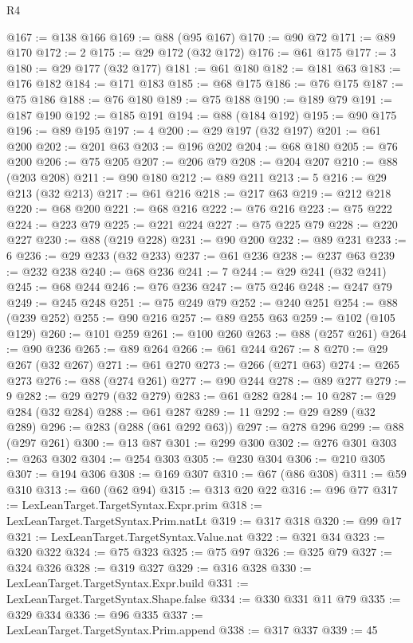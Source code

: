 \begin{lexlean}{R4}
\begin{coremodule}
{{{{{{{{{{{{{{{{{{{{{{{{{{{{{{{{{{{{{{{{{{{{{{{{{{{{{{{{{{{{{{{{{{{{{{{{{{{{{{{{{{{{{{{{{{{{@167 := @138 @166
@169 := @88 (@95 @167)
@170 := @90 @72
@171 := @89 @170
@172 := 2
@175 := @29 @172 (@32 @172)
@176 := @61 @175
@177 := 3
@180 := @29 @177 (@32 @177)
@181 := @61 @180
@182 := @181 @63
@183 := @176 @182
@184 := @171 @183
@185 := @68 @175
@186 := @76 @175
@187 := @75 @186
@188 := @76 @180
@189 := @75 @188
@190 := @189 @79
@191 := @187 @190
@192 := @185 @191
@194 := @88 (@184 @192)
@195 := @90 @175
@196 := @89 @195
@197 := 4
@200 := @29 @197 (@32 @197)
@201 := @61 @200
@202 := @201 @63
@203 := @196 @202
@204 := @68 @180
@205 := @76 @200
@206 := @75 @205
@207 := @206 @79
@208 := @204 @207
@210 := @88 (@203 @208)
@211 := @90 @180
@212 := @89 @211
@213 := 5
@216 := @29 @213 (@32 @213)
@217 := @61 @216
@218 := @217 @63
@219 := @212 @218
@220 := @68 @200
@221 := @68 @216
@222 := @76 @216
@223 := @75 @222
@224 := @223 @79
@225 := @221 @224
@227 := @75 @225 @79
@228 := @220 @227
@230 := @88 (@219 @228)
@231 := @90 @200
@232 := @89 @231
@233 := 6
@236 := @29 @233 (@32 @233)
@237 := @61 @236
@238 := @237 @63
@239 := @232 @238
@240 := @68 @236
@241 := 7
@244 := @29 @241 (@32 @241)
@245 := @68 @244
@246 := @76 @236
@247 := @75 @246
@248 := @247 @79
@249 := @245 @248
@251 := @75 @249 @79
@252 := @240 @251
@254 := @88 (@239 @252)
@255 := @90 @216
@257 := @89 @255 @63
@259 := @102 (@105 @129)
@260 := @101 @259
@261 := @100 @260
@263 := @88 (@257 @261)
@264 := @90 @236
@265 := @89 @264
@266 := @61 @244
@267 := 8
@270 := @29 @267 (@32 @267)
@271 := @61 @270
@273 := @266 (@271 @63)
@274 := @265 @273
@276 := @88 (@274 @261)
@277 := @90 @244
@278 := @89 @277
@279 := 9
@282 := @29 @279 (@32 @279)
@283 := @61 @282
@284 := 10
@287 := @29 @284 (@32 @284)
@288 := @61 @287
@289 := 11
@292 := @29 @289 (@32 @289)
@296 := @283 (@288 (@61 @292 @63))
@297 := @278 @296
@299 := @88 (@297 @261)
@300 := @13 @87
@301 := @299 @300
@302 := @276 @301
@303 := @263 @302
@304 := @254 @303
@305 := @230 @304
@306 := @210 @305
@307 := @194 @306
@308 := @169 @307
@310 := @67 (@86 @308)
@311 := @59 @310
@313 := @60 (@62 @94)
@315 := @313 @20 @22
@316 := @96 @77
@317 := LexLeanTarget.TargetSyntax.Expr.prim
@318 := LexLeanTarget.TargetSyntax.Prim.natLt
@319 := @317 @318
@320 := @99 @17
@321 := LexLeanTarget.TargetSyntax.Value.nat
@322 := @321 @34
@323 := @320 @322
@324 := @75 @323
@325 := @75 @97
@326 := @325 @79
@327 := @324 @326
@328 := @319 @327
@329 := @316 @328
@330 := LexLeanTarget.TargetSyntax.Expr.build
@331 := LexLeanTarget.TargetSyntax.Shape.false
@334 := @330 @331 @11 @79
@335 := @329 @334
@336 := @96 @335
@337 := LexLeanTarget.TargetSyntax.Prim.append
@338 := @317 @337
@339 := 45
}}}}}}}}}}}}}}}}}}}}}}}}}}}}}}}}}}}}}}}}}}}}}}}}}}}}}}}}}}}}}}}}}}}}}}}}}}}}}}}}}}}}}}}}}}}}
\end{coremodule}
\end{lexlean}
